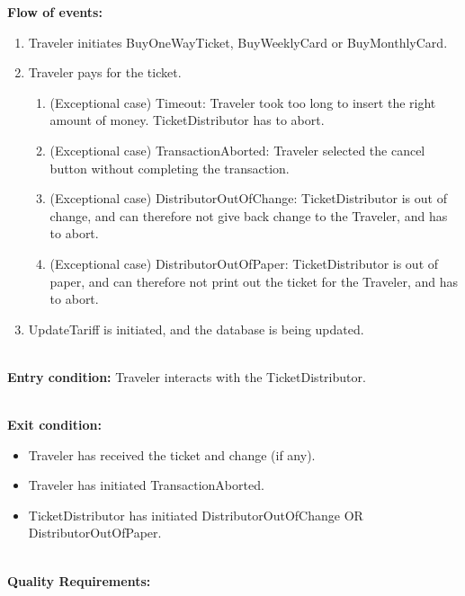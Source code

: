 \textbf{Flow of events:}
\begin{enumerate}
	\item Traveler initiates BuyOneWayTicket, BuyWeeklyCard or BuyMonthlyCard.
	\item Traveler pays for the ticket.
	\begin{enumerate}
		\item (Exceptional case) Timeout: Traveler took too long to insert the right amount of money. TicketDistributor has to abort.
		\item (Exceptional case) TransactionAborted: Traveler selected the cancel button without completing the transaction.
		\item (Exceptional case) DistributorOutOfChange: TicketDistributor is out of change, and can therefore not give back change to the Traveler, and has to abort.
		\item (Exceptional case) DistributorOutOfPaper: TicketDistributor is out of paper, and can therefore not print out the ticket for the Traveler, and has to abort.
	\end{enumerate}
	\item UpdateTariff is initiated, and the database is being updated.
\end{enumerate}

\HRule \\[0.4cm]

\textbf{Entry condition:} Traveler interacts with the TicketDistributor.

\HRule \\[0.4cm]

\textbf{Exit condition:}
\begin{itemize}
	\item Traveler has received the ticket and change (if any).
	\item Traveler has initiated TransactionAborted.
	\item TicketDistributor has initiated DistributorOutOfChange OR DistributorOutOfPaper.
\end{itemize}

\HRule \\[0.4cm]

\textbf{Quality Requirements:}

\HRule \\[0.4cm]
